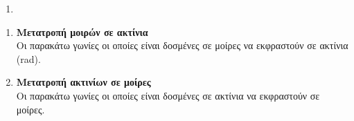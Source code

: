 \documentclass[twoside,nofonts,internet,twocolumn]{askhseis}
\begin{document}
\begin{enumerate}
\item 
\end{enumerate}
\twocolkentro{\askhseis}
\begin{enumerate}
\item \textbf{Μετατροπή μοιρών σε ακτίνια}\\
Οι παρακάτω γωνίες οι οποίες είναι δοσμένες σε μοίρες να εκφραστούν σε ακτίνια (rad).
\begin{multicols}{4}
\begin{rlist}[leftmargin=4mm]
\item $ 30\degree $
\item $ 60\degree $
\item $ 45\degree $
\item $ 120\degree $
\item $ 150\degree $
\item $ 300\degree $
\item $ 270\degree $
\item $ 240\degree $
\item $ 330\degree $
\item $ 400\degree $
\item $ 480\degree $
\item $ 1200\degree $
\end{rlist}
\end{multicols}
\item \textbf{Μετατροπή ακτινίων σε μοίρες}\\
Οι παρακάτω γωνίες οι οποίες είναι δοσμένες σε ακτίνια να εκφραστούν σε μοίρες.
\begin{multicols}{4}
\end{multicols}
\end{enumerate}
\end{document}
